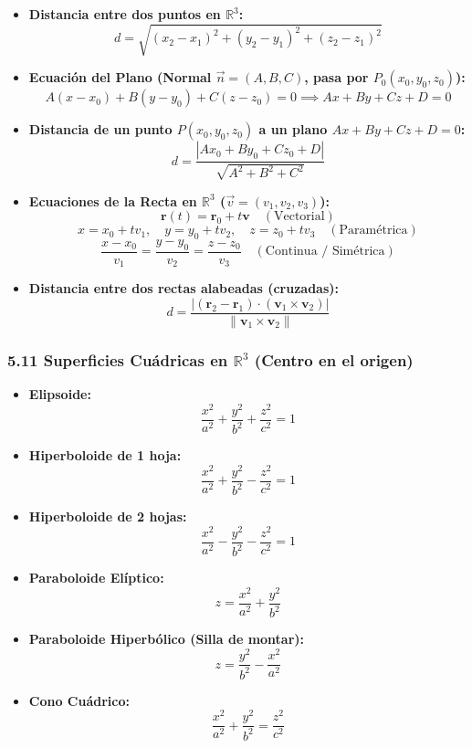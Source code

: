 \documentclass[11pt,a4paper]{article}
\begin{document}
\begin{itemize}
  \item \textbf{Distancia entre dos puntos en $\mathbb{R}^3$:}
  \[
    d = \sqrt{(x_2 - x_1)^2 + (y_2 - y_1)^2 + (z_2 - z_1)^2}
  \]
  \item \textbf{Ecuación del Plano (Normal $\vec{n} = (A, B, C)$, pasa por $P_0(x_0, y_0, z_0)$):}
  \[
    A(x - x_0) + B(y - y_0) + C(z - z_0) = 0 \implies Ax + By + Cz + D = 0
  \]
  \item \textbf{Distancia de un punto $P(x_0, y_0, z_0)$ a un plano $Ax + By + Cz + D = 0$:}
  \[
    d = \frac{|Ax_0 + By_0 + Cz_0 + D|}{\sqrt{A^2 + B^2 + C^2}}
  \]
  \item \textbf{Ecuaciones de la Recta en $\mathbb{R}^3$ ($\vec{v} = (v_1, v_2, v_3)$):}
  \[
    \mathbf{r}(t) = \mathbf{r}_0 + t\mathbf{v} \quad (\text{Vectorial})
  \]
  \[
    x = x_0 + tv_1, \quad y = y_0 + tv_2, \quad z = z_0 + tv_3 \quad (\text{Paramétrica})
  \]
  \[
    \frac{x - x_0}{v_1} = \frac{y - y_0}{v_2} = \frac{z - z_0}{v_3} \quad (\text{Continua / Simétrica})
  \]
  \item \textbf{Distancia entre dos rectas alabeadas (cruzadas):}
  \[
    d = \frac{|(\mathbf{r}_2 - \mathbf{r}_1) \cdot (\mathbf{v}_1 \times \mathbf{v}_2)|}{\|\mathbf{v}_1 \times \mathbf{v}_2\|}
  \]
\end{itemize}

\subsubsection*{5.11 Superficies Cuádricas en $\mathbb{R}^3$ (Centro en el origen)}

\begin{itemize}
  \item \textbf{Elipsoide:}
  \[
    \frac{x^2}{a^2} + \frac{y^2}{b^2} + \frac{z^2}{c^2} = 1
  \]
  \item \textbf{Hiperboloide de 1 hoja:}
  \[
    \frac{x^2}{a^2} + \frac{y^2}{b^2} - \frac{z^2}{c^2} = 1
  \]
  \item \textbf{Hiperboloide de 2 hojas:}
  \[
    \frac{x^2}{a^2} - \frac{y^2}{b^2} - \frac{z^2}{c^2} = 1
  \]
  \item \textbf{Paraboloide Elíptico:}
  \[
    z = \frac{x^2}{a^2} + \frac{y^2}{b^2}
  \]
  \item \textbf{Paraboloide Hiperbólico (Silla de montar):}
  \[
    z = \frac{y^2}{b^2} - \frac{x^2}{a^2}
  \]
  \item \textbf{Cono Cuádrico:}
  \[
    \frac{x^2}{a^2} + \frac{y^2}{b^2} = \frac{z^2}{c^2}
  \]
\end{itemize}
\end{document}
